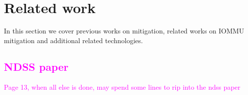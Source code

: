 \begin{comment}
\section{RDMA}
Remote DMA(RDMA)\footnote{Member Companies of Openfabrics alliance are mostly behind these technologies \url{https://www.openfabrics.org/}} is a set of protocols(Infiniband,IWARP,RoCE) that facilitate access to the main memory of a remote machines. We wanted to see if some of the attacks could be perpetrated via a malicious peer.  
We didn't find any risks associated with RDMA, other than the risks associated with device drivers, listed in this paper. The ipoib driver is one such driver, one which also maps \shinfo. A malicious device is still needed, as the post\_send/post\_receive API used by the ipoib driver is similar in function to the usual way NICs function; namely a remote user can't pick where to write or choose to write more than once to the same address. These kinds of operations are supported by rdma\_read/write API; which provides the peer with the ability to read/write from/to a specified addresses. We didn't find any uses for this kind of API in the Linux kernel. With post\_send/post\_receive API, the remote host can only modify legitimate memory buffers; and thus can't take advantage of sub-page vulnerabilities.
\textcolor{red}{Am I answering a question that no one asked?}
\end{comment}

\section{Related work}
In this section we cover previous works on mitigation, related works on IOMMU mitigation and additional related technologies.
\subsection{\textcolor{magenta}{NDSS paper}}
\textcolor{magenta}{Page 13, when all else is done, may spend some lines to rip into the ndss paper}


